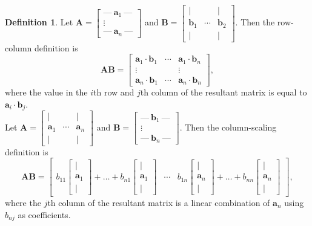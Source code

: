 \documentclass[11pt]{scrartcl}
\theoremstyle{plain}
\theoremstyle{definition}
\newtheorem*{definition}{Definition}
\theoremstyle{remark}
\begin{document}
\begin{definition}
    Let $\mathbf{A}=\begin{bmatrix}\text{---}\ \mathbf{a}_{1}\ \text{---} \\ \vdots \\ \text{---}\ \mathbf{a}_{n}\ \text{---}
    \end{bmatrix}$ and $\mathbf{B}=\begin{bmatrix}| & & | \\ \mathbf{b}_{1} & \cdots & \mathbf{b}_{2} \\ | & & |\end{bmatrix}$. 
    Then the row-column definition is
    \[ \mathbf{A}\mathbf{B}=\begin{bmatrix}\mathbf{a}_{1}\cdot \mathbf{b}_{1} & \cdots & \mathbf{a}_{1}\cdot \mathbf{b}_{n} \\ 
    \vdots & & \vdots \\ \mathbf{a}_{n}\cdot \mathbf{b}_{1} & \cdots & \mathbf{a}_{n}\cdot \mathbf{b}_{n}\end{bmatrix},\]
    where the value in the $i$th row and $j$th column of the resultant matrix is equal to $\mathbf{a}_{i}\cdot 
    \mathbf{b}_{j}$. \\[-0.5em]

    Let $\mathbf{A}=\begin{bmatrix}| & & | \\ \mathbf{a}_{1} & \cdots & \mathbf{a}_{n} \\ | & & |\end{bmatrix}$ and $\mathbf{B}=
    \begin{bmatrix}\text{---}\ \mathbf{b}_{1}\ \text{---} \\ \vdots \\ \text{---}\ \mathbf{b}_{n}\ \text{---}\end{bmatrix}$.
    Then the column-scaling definition is
    \[ \mathbf{A}\mathbf{B}=\begin{bmatrix}b_{11}\begin{bmatrix}| \\ \mathbf{a}_{1} \\ |\end{bmatrix}+\dots +b_{n1}
    \begin{bmatrix}| \\ \mathbf{a}_{1} \\ |\end{bmatrix} &\cdots &b_{1n}\begin{bmatrix}| \\ \mathbf{a}_{n} \\ |\end{bmatrix}
    +\dots + b_{nn}\begin{bmatrix}| \\ \mathbf{a}_{n} \\ |\end{bmatrix}\end{bmatrix}, \]
    where the $j$th column of the resultant matrix is a linear combination of $\mathbf{a}_{n}$ using $b_{nj}$ as 
    coefficients.
\end{definition} %
\end{document}
